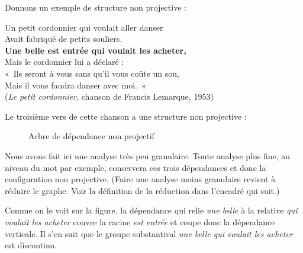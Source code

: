 Donnons un exemple de structure non projective :

\ea
Un petit cordonnier qui voulait aller danser\\
Avait fabriqué de petits souliers.\\
\textbf{Une belle est entrée qui voulait les acheter,}\\
Mais le cordonnier lui a déclaré :\\
«~Ils seront à vous sans qu’il vous coûte un sou,\\
Mais il vous faudra danser avec moi.~»\\
(\textit{Le petit cordonnier}, chanson de Francis Lemarque, 1953)
\z

Le troisième vers de cette chanson a une structure non projective :

\begin{figure}
\caption{\label{fig:}Arbre de dépendance non projectif}
\end{figure}

Nous avons fait ici une analyse très peu granulaire. Toute analyse plus fine, au niveau du mot par exemple, conservera ces trois dépendances et donc la configuration non projective. (Faire une analyse moins granulaire revient à réduire le graphe. Voir la définition de la réduction dans l’encadré qui suit.)

Comme on le voit sur la figure, la dépendance qui relie \textit{une belle} à la relative \textit{qui voulait les acheter} couvre la racine \textit{est entrée} et coupe donc la dépendance verticale. Il s’en suit que le groupe substantival \textit{une belle qui voulait les acheter} est discontinu.

